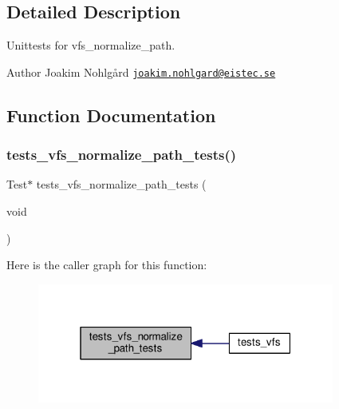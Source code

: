 \subsection{Detailed Description}
Unittests for vfs\+\_\+normalize\+\_\+path. 

\begin{DoxyAuthor}{Author}
Joakim Nohlgård \href{mailto:joakim.nohlgard@eistec.se}{\tt joakim.\+nohlgard@eistec.\+se} 
\end{DoxyAuthor}


\subsection{Function Documentation}
\mbox{\label{tests-vfs-normalize__path_8c_abe821476b768ed80152215152e320355}} 
\subsubsection{\texorpdfstring{tests\+\_\+vfs\+\_\+normalize\+\_\+path\+\_\+tests()}{tests\_vfs\_normalize\_path\_tests()}}
{\footnotesize\ttfamily Test$\ast$ tests\+\_\+vfs\+\_\+normalize\+\_\+path\+\_\+tests (\begin{DoxyParamCaption}\item[{void}]{ }\end{DoxyParamCaption})}

Here is the caller graph for this function\+:
\nopagebreak
\begin{figure}[H]
\begin{center}
\leavevmode
\includegraphics[width=277pt]{tests-vfs-normalize__path_8c_abe821476b768ed80152215152e320355_icgraph}
\end{center}
\end{figure}
